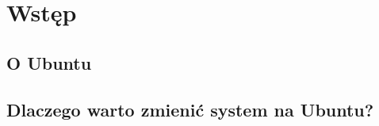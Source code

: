 \documentclass[a4paper, 11pt,oneside]{mwart}
\begin{document}


\section{Wstęp}
	
	\subsection{O Ubuntu}
		
	\subsection{Dlaczego warto zmienić system na Ubuntu?}
		
		
\end{document}
